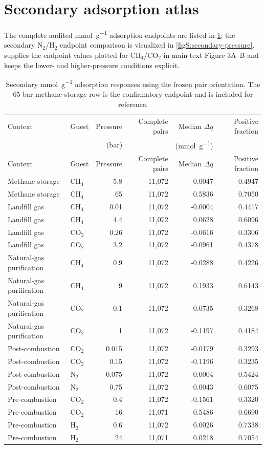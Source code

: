 \documentclass[11pt,a4paper]{article}
\begin{document}
\section{Secondary adsorption atlas}
\label{sec:secondary-adsorption}

The complete audited \si{\milli\mole\per\gram} adsorption endpoints are listed in \cref{tab:S10}; the secondary N$_2$/H$_2$ endpoint comparison is visualized in \cref{figS:secondary-pressure}.  supplies the endpoint values plotted for CH$_4$/CO$_2$ in main-text Figure 3A--B and keeps the lower- and higher-pressure conditions explicit.


\begin{longtable}{llrrrr}
\caption{Secondary \si{\milli\mole\per\gram} adsorption responses using the frozen
pair orientation. The 65-bar methane-storage row is the confirmatory endpoint and
is included for reference.}\label{tab:S10}\\
\toprule
Context & Guest & Pressure & Complete pairs & Median $\Delta q$ &
Positive fraction \\
 & & (bar) & & (\si{\milli\mole\per\gram}) & \\
\midrule
\endfirsthead
\toprule
Context & Guest & Pressure & Complete pairs & Median $\Delta q$ &
Positive fraction \\
\midrule
\endhead
Methane storage & CH$_4$ & 5.8 & 11,072 & -0.0047 & 0.4947 \\
Methane storage & CH$_4$ & 65 & 11,072 & 0.5836 & 0.7050 \\
Landfill gas & CH$_4$ & 0.01 & 11,072 & -0.0004 & 0.4417 \\
Landfill gas & CH$_4$ & 4.4 & 11,072 & 0.0628 & 0.6096 \\
Landfill gas & CO$_2$ & 0.26 & 11,072 & -0.0616 & 0.3306 \\
Landfill gas & CO$_2$ & 3.2 & 11,072 & -0.0961 & 0.4378 \\
Natural-gas purification & CH$_4$ & 0.9 & 11,072 & -0.0288 & 0.4226 \\
Natural-gas purification & CH$_4$ & 9 & 11,072 & 0.1933 & 0.6143 \\
Natural-gas purification & CO$_2$ & 0.1 & 11,072 & -0.0735 & 0.3268 \\
Natural-gas purification & CO$_2$ & 1 & 11,072 & -0.1197 & 0.4184 \\
Post-combustion & CO$_2$ & 0.015 & 11,072 & -0.0179 & 0.3293 \\
Post-combustion & CO$_2$ & 0.15 & 11,072 & -0.1196 & 0.3235 \\
Post-combustion & N$_2$ & 0.075 & 11,072 & 0.0004 & 0.5424 \\
Post-combustion & N$_2$ & 0.75 & 11,072 & 0.0043 & 0.6075 \\
Pre-combustion & CO$_2$ & 0.4 & 11,072 & -0.1561 & 0.3320 \\
Pre-combustion & CO$_2$ & 16 & 11,071 & 0.5486 & 0.6690 \\
Pre-combustion & H$_2$ & 0.6 & 11,072 & 0.0026 & 0.7338 \\
Pre-combustion & H$_2$ & 24 & 11,071 & 0.0218 & 0.7054 \\
\bottomrule
\end{longtable}
\end{document}
